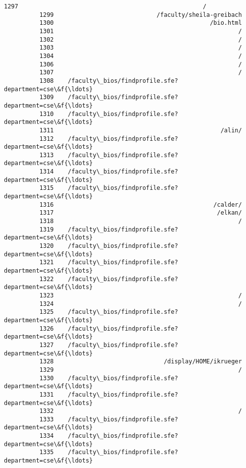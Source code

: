\documentclass[11pt]{article}
\begin{document}
\begin{Verbatim}[commandchars=\\\{\}]
          1297                                                    /
          1299                             /faculty/sheila-greibach
          1300                                            /bio.html
          1301                                                    /
          1302                                                    /
          1303                                                    /
          1304                                                    /
          1306                                                    /
          1307                                                    /
          1308    /faculty\_bios/findprofile.sfe?department=cse\&f{\ldots}
          1309    /faculty\_bios/findprofile.sfe?department=cse\&f{\ldots}
          1310    /faculty\_bios/findprofile.sfe?department=cse\&f{\ldots}
          1311                                               /alin/
          1312    /faculty\_bios/findprofile.sfe?department=cse\&f{\ldots}
          1313    /faculty\_bios/findprofile.sfe?department=cse\&f{\ldots}
          1314    /faculty\_bios/findprofile.sfe?department=cse\&f{\ldots}
          1315    /faculty\_bios/findprofile.sfe?department=cse\&f{\ldots}
          1316                                             /calder/
          1317                                              /elkan/
          1318                                                    /
          1319    /faculty\_bios/findprofile.sfe?department=cse\&f{\ldots}
          1320    /faculty\_bios/findprofile.sfe?department=cse\&f{\ldots}
          1321    /faculty\_bios/findprofile.sfe?department=cse\&f{\ldots}
          1322    /faculty\_bios/findprofile.sfe?department=cse\&f{\ldots}
          1323                                                    /
          1324                                                    /
          1325    /faculty\_bios/findprofile.sfe?department=cse\&f{\ldots}
          1326    /faculty\_bios/findprofile.sfe?department=cse\&f{\ldots}
          1327    /faculty\_bios/findprofile.sfe?department=cse\&f{\ldots}
          1328                               /display/HOME/ikrueger
          1329                                                    /
          1330    /faculty\_bios/findprofile.sfe?department=cse\&f{\ldots}
          1331    /faculty\_bios/findprofile.sfe?department=cse\&f{\ldots}
          1332                                                    /
          1333    /faculty\_bios/findprofile.sfe?department=cse\&f{\ldots}
          1334    /faculty\_bios/findprofile.sfe?department=cse\&f{\ldots}
          1335    /faculty\_bios/findprofile.sfe?department=cse\&f{\ldots}

\end{Verbatim}
\end{document}
